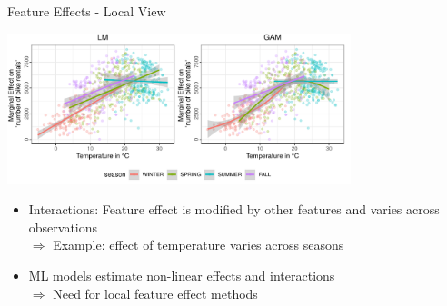 \documentclass[11pt,compress,t,notes=noshow, aspectratio=169, xcolor=table]{beamer}
\begin{document}
\begin{frame}{Feature Effects - Local View}

\centerline{\includegraphics[width=0.75\textwidth, trim=0cm 0.1cm 0cm 0cm, clip]{figure/lm_main_interactions}}

\begin{itemize}
    \item Interactions: Feature effect is modified by other features and varies across observations \\ 
    $\Rightarrow$ Example: effect of temperature varies across seasons
    \item ML models estimate non-linear effects and interactions \\
    $\Rightarrow$ Need for local feature effect methods
\end{itemize}




\end{frame}

%
%
%
%
%
%
\end{document}
